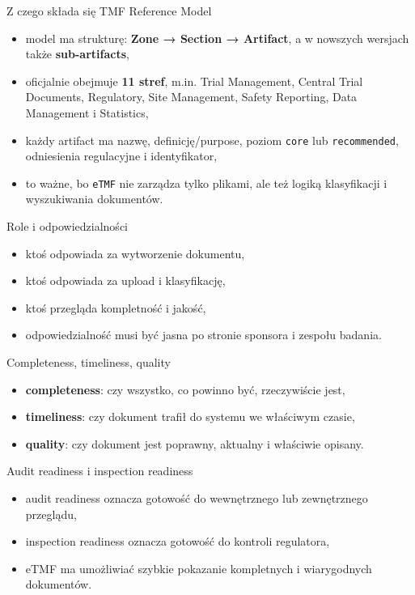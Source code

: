 \begin{frame}{Z czego składa się TMF Reference Model}
  \begin{itemize}
    \item model ma strukturę: \textbf{Zone → Section → Artifact}, a w nowszych wersjach także \textbf{sub-artifacts},
    \item oficjalnie obejmuje \textbf{11 stref}, m.in. Trial Management, Central Trial Documents, Regulatory, Site Management, Safety Reporting, Data Management i Statistics,
    \item każdy artifact ma nazwę, definicję/purpose, poziom \texttt{core} lub \texttt{recommended}, odniesienia regulacyjne i identyfikator,
    \item to ważne, bo \texttt{eTMF} nie zarządza tylko plikami, ale też logiką klasyfikacji i wyszukiwania dokumentów.
  \end{itemize}
\end{frame}

\begin{frame}{Role i odpowiedzialności}
  \begin{itemize}
    \item ktoś odpowiada za wytworzenie dokumentu,
    \item ktoś odpowiada za upload i klasyfikację,
    \item ktoś przegląda kompletność i jakość,
    \item odpowiedzialność musi być jasna po stronie sponsora i zespołu badania.
  \end{itemize}
\end{frame}

\begin{frame}{Completeness, timeliness, quality}
  \begin{itemize}
    \item \textbf{completeness}: czy wszystko, co powinno być, rzeczywiście jest,
    \item \textbf{timeliness}: czy dokument trafił do systemu we właściwym czasie,
    \item \textbf{quality}: czy dokument jest poprawny, aktualny i właściwie opisany.
  \end{itemize}
\end{frame}

\begin{frame}{Audit readiness i inspection readiness}
  \begin{itemize}
    \item audit readiness oznacza gotowość do wewnętrznego lub zewnętrznego przeglądu,
    \item inspection readiness oznacza gotowość do kontroli regulatora,
    \item eTMF ma umożliwiać szybkie pokazanie kompletnych i wiarygodnych dokumentów.
  \end{itemize}
\end{frame}

